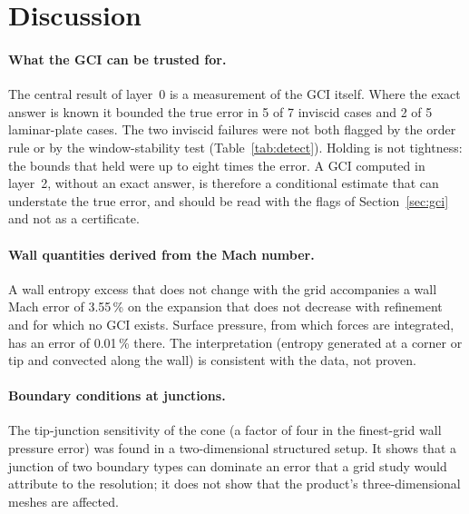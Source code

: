 \documentclass[11pt,a4paper]{article}
\begin{document}
\section{Discussion}
\label{sec:discussion}

\paragraph{What the GCI can be trusted for.}
The central result of layer~0 is a measurement of the GCI itself.
Where the exact answer is known it bounded the true error in 5 of 7 inviscid cases and 2 of 5 laminar-plate cases.
The two inviscid failures were not both flagged by the order rule or by the window-stability test (Table~\ref{tab:detect}).
Holding is not tightness: the bounds that held were up to eight times the error.
A GCI computed in layer~2, without an exact answer, is therefore a conditional estimate that can understate the true
error, and should be read with the flags of Section~\ref{sec:gci} and not as a certificate.

\paragraph{Wall quantities derived from the Mach number.}
A wall entropy excess that does not change with the grid accompanies a wall Mach error of 3.55\,\% on the expansion that does not
decrease with refinement and for which no GCI exists.
Surface pressure, from which forces are integrated, has an error of 0.01\,\% there.
The interpretation (entropy generated at a corner or tip and convected along the wall) is consistent with the data,
not proven.

\paragraph{Boundary conditions at junctions.}
The tip-junction sensitivity of the cone (a factor of four in the finest-grid wall pressure error) was found in a two-dimensional
structured setup.
It shows that a junction of two boundary types can dominate an error that a grid study would attribute to the
resolution; it does not show that the product's three-dimensional meshes are affected.
\end{document}
